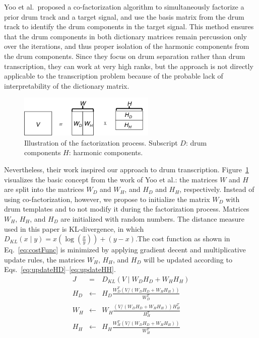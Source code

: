 \documentclass{article}
\newcommand{\figref}[1]{\mbox{Figure~\ref{#1}}}
\begin{document}
Yoo et al.\ proposed a co-factorization algorithm \cite{yoo_nonnegative_2010} to simultaneously factorize a prior drum track and a target signal, and use the basis matrix from the drum track to identify the drum components in the target signal. This method ensures that the drum components in both dictionary matrices remain percussion only over the iterations, and thus proper isolation of the harmonic components from the drum components. Since they focus on drum separation rather than drum transcription, they can work at very high ranks, but the approach is not directly applicable to the transcription problem because of the probable lack of interpretability of the dictionary matrix.
\begin{figure}
 \centering 
  \centerline{
 \includegraphics[width=6.5cm]{factorization_small.png}}
 \caption{Illustration of the factorization process. Subscript $D$: drum components $H$: harmonic components.}
 \label{fig:factorization}
\end{figure}

Nevertheless, their work inspired our approach to drum transcription. \figref{fig:factorization} visualizes the basic concept from the work of Yoo et al.: the matrices $W$ and $H$ are split into the  matrices $W_D$ and $W_H$, and  $H_D$ and $H_H$, respectively. Instead of using co-factorization, however, we propose to initialize the matrix $W_D$ with drum templates and to not modify it during the factorization process. Matrices $W_H$, $H_H$, and $H_D$ are initialized with random numbers. 
The distance measure used in this paper is KL-divergence, in which \(D_{KL}(x \mid y) = x(\log(\frac{x}{y})) + (y - x). \)The cost function as shown in Eq.~\eqref{eq:costFunc} is minimized by applying gradient decent and multiplicative update rules, the matrices  $W_H$, $H_H$, and $H_D$ will be updated according to \mbox{Eqs.~\eqref{eq:updateHD}--\eqref{eq:updateHH}}.  %
\begin{eqnarray}
\label{eq:costFunc}
J &=& D_{KL}(V \mid W_{D}H_{D} + W_{H}H_{H})\\
\label{eq:updateHD}
H_{D} &\leftarrow& H_{D}\frac{W_{D}^T( V / (W_{D}H_{D} + W_{H}H_{H}))}{W_{D}^T}\\
%
\label{eq:updateWH}
W_{H} &\leftarrow& W_{H}\frac{(V/(W_{D}H_{D} + W_{H}H_{H})) H_{H}^T}{H_{H}^T}\\
%
\label{eq:updateHH}
H_{H} &\leftarrow& H_{H}\frac{W_{H}^T (V/(W_{D}H_{D} + W_{H}H_{H}))}{W_{H}^T}
\end{eqnarray}
\end{document}
